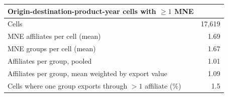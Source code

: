 \begin{tabular}{lr}
\toprule
Origin-destination-product-year cells with $\geq 1$ MNE & \\
\midrule
Cells & 17,619 \\
MNE affiliates per cell (mean) & 1.69 \\
MNE groups per cell (mean) & 1.67 \\
Affiliates per group, pooled & 1.01 \\
Affiliates per group, mean weighted by export value & 1.09 \\
Cells where one group exports through $>1$ affiliate (\%) & 1.5 \\
\bottomrule
\end{tabular}
